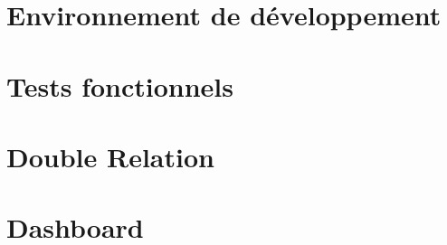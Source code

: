 \section{Environnement de développement}
	

\section{Tests fonctionnels}
	
	
\section{Double Relation}
	
	
\section{Dashboard}
	